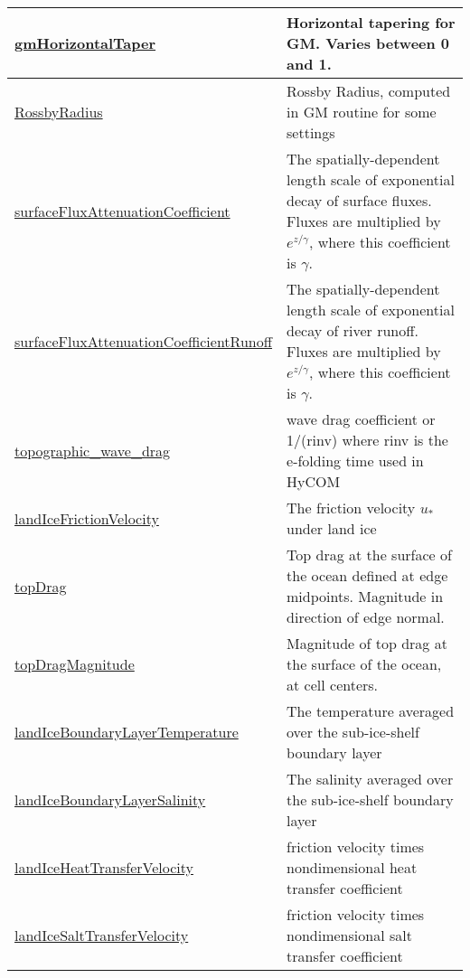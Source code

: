{\begin{center}
\begin{longtable}{| p{2.0in} | p{4.0in} |}
    \hline
    \hyperref[subsec:var_sec_diagnostics_gmHorizontalTaper]{gmHorizontalTaper} & Horizontal tapering for GM. Varies between 0 and 1. \\
    \hline
    \hyperref[subsec:var_sec_diagnostics_RossbyRadius]{RossbyRadius} & Rossby Radius, computed in GM routine for some settings \\
    \hline
    \hyperref[subsec:var_sec_diagnostics_surfaceFluxAttenuationCoefficient]{surfaceFluxAttenuation\-Coefficient} & The spatially-dependent length scale of exponential decay of surface fluxes. Fluxes are multiplied by $e^{z/\gamma}$, where this coefficient is $\gamma$. \\
    \hline
    \hyperref[subsec:var_sec_diagnostics_surfaceFluxAttenuationCoefficientRunoff]{surfaceFluxAttenuation\-CoefficientRunoff} & The spatially-dependent length scale of exponential decay of river runoff. Fluxes are multiplied by $e^{z/\gamma}$, where this coefficient is $\gamma$. \\
    \hline
    \hyperref[subsec:var_sec_diagnostics_topographic_wave_drag]{topographic\_wave\_drag} & wave drag coefficient or 1/(rinv) where rinv is the e-folding time used in HyCOM \\
    \hline
    \hyperref[subsec:var_sec_diagnostics_landIceFrictionVelocity]{landIceFrictionVelocity} & The friction velocity $u_*$ under land ice \\
    \hline
    \hyperref[subsec:var_sec_diagnostics_topDrag]{topDrag} & Top drag at the surface of the ocean defined at edge midpoints. Magnitude in direction of edge normal. \\
    \hline
    \hyperref[subsec:var_sec_diagnostics_topDragMagnitude]{topDragMagnitude} & Magnitude of top drag at the surface of the ocean, at cell centers. \\
    \hline
    \hyperref[subsec:var_sec_diagnostics_landIceBoundaryLayerTemperature]{landIceBoundaryLayer\-Temperature} & The temperature averaged over the sub-ice-shelf boundary layer \\
    \hline
    \hyperref[subsec:var_sec_diagnostics_landIceBoundaryLayerSalinity]{landIceBoundaryLayerSalinity} & The salinity averaged over the sub-ice-shelf boundary layer \\
    \hline
    \hyperref[subsec:var_sec_diagnostics_landIceHeatTransferVelocity]{landIceHeatTransferVelocity} & friction velocity times nondimensional heat transfer coefficient \\
    \hline
    \hyperref[subsec:var_sec_diagnostics_landIceSaltTransferVelocity]{landIceSaltTransferVelocity} & friction velocity times nondimensional salt transfer coefficient \\

\end{longtable}
\end{center}}
